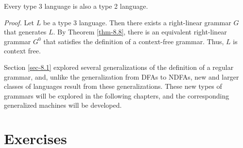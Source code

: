 \begin{cor}\label{cor-8.3}
Every type 3 language is also a type 2 language.

\emph{Proof.} Let $L$ be a type 3 language. Then there exists a right-linear
grammar $G$ that generates $L$. By Theorem \ref{thm-8.8}, there is an equivalent
right-linear grammar $G^0$ that satisfies the definition of a context-free
grammar. Thus, $L$ is context free.
\end{cor}

Section \ref{sec-8.1} explored several generalizations of the definition of a regular
grammar, and, unlike the generalization from DFAs to NDFAs, new and larger
classes of languages result from these generalizations. These new types of
grammars will be explored in the following chapters, and the corresponding
generalized machines will be developed.

\section*{Exercises}

